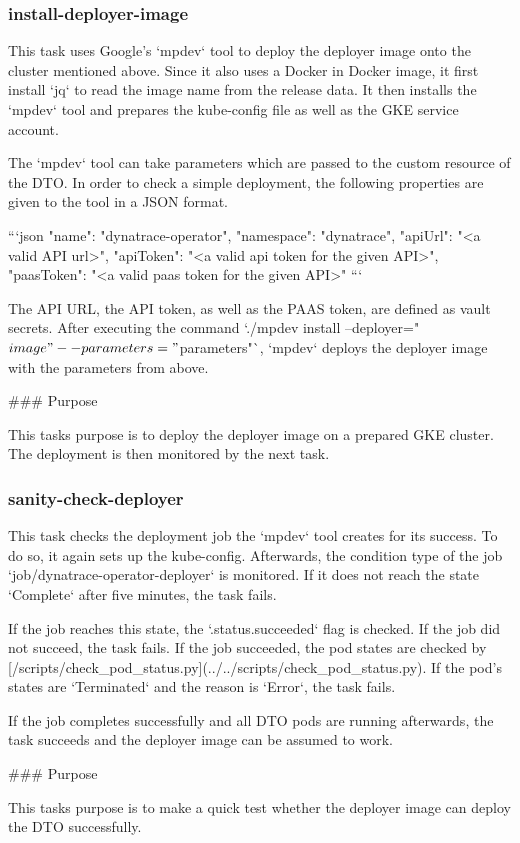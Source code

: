 \subsubsection{install-deployer-image}\label{subsubsec:install-deployer-image}

This task uses Google's `mpdev` tool to deploy the deployer image onto the cluster mentioned above.
Since it also uses a Docker in Docker image, it first install `jq` to read the image name from the release data.
It then installs the `mpdev` tool and prepares the kube-config file as well as the GKE service account.

The `mpdev` tool can take parameters which are passed to the custom resource of the DTO.
In order to check a simple deployment, the following properties are given to the tool in a JSON format.

```json
    {
    "name": "dynatrace-operator",
    "namespace": "dynatrace",
    "apiUrl": "<a valid API url>",
    "apiToken": "<a valid api token for the given API>",
    "paasToken": "<a valid paas token for the given API>"
}
```

The API URL, the API token, as well as the PAAS token, are defined as vault secrets.
After executing the command `./mpdev install --deployer="${image}" --parameters="${parameters}"`, `mpdev` deploys the deployer image with the parameters from above.

### Purpose

This tasks purpose is to deploy the deployer image on a prepared GKE cluster.
The deployment is then monitored by the next task.

\subsubsection{sanity-check-deployer}\label{subsubsec:sanity-check-deployer}

This task checks the deployment job the `mpdev` tool creates for its success.
To do so, it again sets up the kube-config.
Afterwards, the condition type of the job `job/dynatrace-operator-deployer` is monitored.
If it does not reach the state `Complete` after five minutes, the task fails.

If the job reaches this state, the `.status.succeeded` flag is checked.
If the job did not succeed, the task fails.
If the job succeeded, the pod states are checked by [/scripts/check_pod_status.py](../../scripts/check_pod_status.py).
If the pod's states are `Terminated` and the reason is `Error`, the task fails.

If the job completes successfully and all DTO pods are running afterwards, the task succeeds and the deployer image can be assumed to work.

### Purpose

This tasks purpose is to make a quick test whether the deployer image can deploy the DTO successfully.
